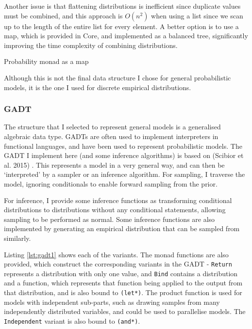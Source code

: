 \documentclass[sigconf]{acmart}
\begin{document}
Another issue is that flattening distributions is inefficient since duplicate values must be combined, and this approach is $O(n^2)$ when using a list since we scan up to the length of the entire list for every element. A better option is to use a map, which is provided in Core, and implemented as a balanced tree, significantly improving the time complexity of combining distributions.

\begin{listing}[!ht]
  \caption{Probability monad as a map}
  \label{lst:monad_pmap}
\end{listing}

Although this is not the final data structure I chose for general probabilistic models, it is the one I used for discrete empirical distributions.

\subsubsection{GADT} \label{sec:gadt}

The structure that I selected to represent general models is a generalised algebraic data type. GADTs are often used to implement interpreters in functional languages, and have been used to represent probabilistic models. The GADT I implement here (and some inference algorithms) is based on (Scibior et al. 2015) \cite{scibior2015practical}. This represents a model in a very general way, and can then be `interpreted' by a sampler or an inference algorithm. For sampling, I traverse the model, ignoring conditionals to enable forward sampling from the prior.

For inference, I provide some inference functions as transforming conditional distributions to distributions without any conditional statements, allowing sampling to be performed as normal. Some inference functions are also implemented by generating an empirical distribution that can be sampled from similarly.

Listing \ref{lst:gadt1} shows each of the variants. The monad functions are also provided, which construct the corresponding variants in the GADT - \texttt{Return} represents a distribution with only one value, and \texttt{Bind} contains a distribution and a function, which represents that function being applied to the output from that distribution, and is also bound to \texttt{(let*)}. The product function is used for models with independent sub-parts, such as drawing samples from many independently distributed variables, and could be used to parallelise models. The \texttt{Independent} variant is also bound to \texttt{(and*)}.
\end{document}

